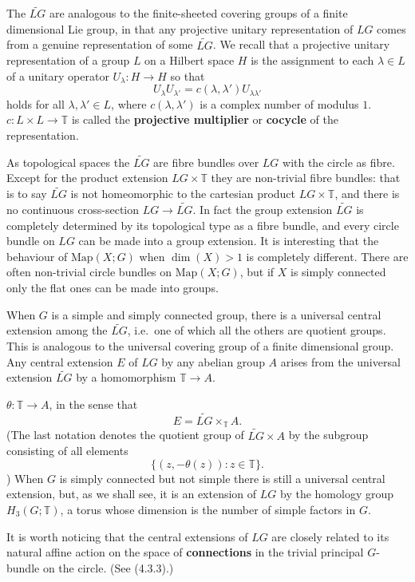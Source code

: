 \documentclass[12pt]{article}
\begin{document}
The $\widetilde{LG}$ are
analogous to the finite-sheeted covering groups of a finite dimensional
Lie group, in that any projective unitary representation of $LG$ comes
from a genuine representation of some $\widetilde{LG}$. We recall that a
projective unitary representation of a group $L$ on a Hilbert space $H$
is the assignment to each $\lambda \in L$ of a unitary operator
$U_\lambda : H \to H$ so that
\[
    U_\lambda U_{\lambda'} = c(\lambda, \lambda') U_{\lambda\lambda'}
\]
holds for all $\lambda, \lambda' \in L$, where $c(\lambda,\lambda')$ is a
complex number of modulus $1$. $c : L \times L \to \mathbb{T}$ is called the \textbf{projective multiplier} or \textbf{cocycle} of the representation.

As topological spaces the $\widetilde{LG}$ are fibre bundles over $LG$ with the circle as fibre. Except for the product extension $LG \times \mathbb{T}$ they are non-trivial fibre bundles: that is to say
$\widetilde{LG}$ is not homeomorphic to the cartesian product
$LG \times \mathbb{T}$, and there is no continuous cross-section
$LG \to \widetilde{LG}$. In fact the group extension $\widetilde{LG}$ is
completely determined by its topological type as a fibre bundle, and
every circle bundle on $LG$ can be made into a group extension. It is
interesting that the behaviour of $\mathrm{Map}(X;G)$ when
$\dim(X) > 1$ is completely different. There are often non-trivial circle
bundles on $\mathrm{Map}(X;G)$, but if $X$ is simply connected only the flat ones can be made into groups.

When $G$ is a simple and simply connected group, there is a universal central extension among the $\widetilde{LG}$, i.e.\ one of
which all the others are quotient groups. This is analogous to the
universal covering group of a finite dimensional group. Any central
extension $E$ of $LG$ by any abelian group $A$ arises from the universal
extension $\widetilde{LG}$ by a homomorphism
$\mathbb{T} \to A$.

$\theta : \mathbb{T} \to A$, in the sense that
\[
    E = \widetilde{LG} \times_{\mathbb{T}} A.
\]
(The last notation denotes the quotient group of $\widetilde{LG} \times A$ by the subgroup consisting of all elements
\[
    \{(z, -\theta(z)) : z \in \mathbb{T}\}.
\])
When $G$ is simply connected but not simple there is still a universal central extension, but, as we shall see, it is an extension of $LG$ by the homology group $H_3(G;\mathbb{T})$, a torus whose dimension is the number of simple factors in $G$.

It is worth noticing that the central extensions of $LG$ are closely related to its natural affine action on the space of \textbf{connections} in the trivial principal $G$-bundle on the circle. (See (4.3.3).)
\end{document}
